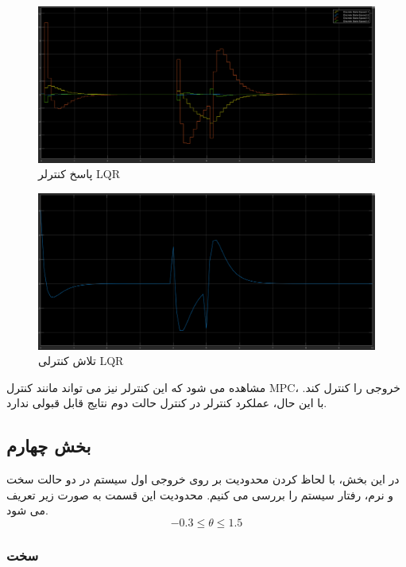  \begin{figure}[H]
 	\centering
 	\includegraphics[width=1\linewidth]{../img/Q3_LQR_Output}
 	\caption{پاسخ کنترلر LQR}
 	\label{fig:q3lqroutput}
 \end{figure}
 
 \begin{figure}[H]
 	\centering
 	\includegraphics[width=1\linewidth]{../img/Q3_LQR_control_effort}
 	\caption{تلاش کنترلی LQR}
 	\label{fig:q3lqrcontroleffort}
 \end{figure}
 
 مشاهده می شود که این کنترلر نیز می تواند مانند کنترل MPC، خروجی را کنترل کند. با این حال، عملکرد کنترلر در کنترل حالت دوم نتایج قابل قبولی ندارد.
 
\subsection{بخش چهارم}

در این بخش، با لحاظ کردن محدودیت بر روی خروجی اول سیستم در دو حالت سخت و نرم، رفتار سیستم را بررسی می کنیم.
محدودیت این قسمت به صورت زیر تعریف می شود.
\[
-0.3 \leq \theta \leq 1.5
\]

\subsubsection{سخت}

